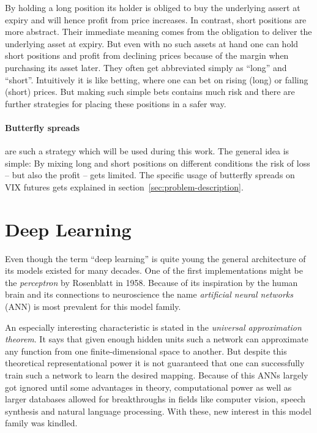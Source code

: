 By holding a long position its holder is obliged to buy the underlying assert at expiry and will hence profit from price increases. In contrast, short positions are more abstract. Their immediate meaning comes from the obligation to deliver the underlying asset at expiry. But even with no such assets at hand one can hold short positions and profit from declining prices because of the margin when purchasing its asset later. They often get abbreviated simply as ``long'' and ``short''. Intuitively it is like betting, where one can bet on rising (long) or falling (short) prices. But making such simple bets contains much risk and there are further strategies for placing these positions in a safer way.

\paragraph{Butterfly spreads} are such a strategy which will be used during this work. The general idea is simple: By mixing long and short positions on different conditions the risk of loss -- but also the profit -- gets limited. The specific usage of butterfly spreads on VIX futures gets explained in section~\ref{sec:problem-description}.

\section{Deep Learning}
\label{sec:deep-learning}

Even though the term ``deep learning'' is quite young the general architecture of its models existed for many decades. One of the first implementations might be the \emph{perceptron} by Rosenblatt in 1958. Because of its inspiration by the human brain and its connections to neuroscience the name \emph{artificial neural networks} (ANN) is most prevalent for this model family.

An especially interesting characteristic is stated in the \emph{universal approximation theorem}.\cite{Hornik-1989} It says that given enough hidden units such a network can approximate any function from one finite-dimensional space to another. But despite this theoretical representational power it is not guaranteed that one can successfully train such a network to learn the desired mapping. Because of this ANNs largely got ignored until some advantages in theory, computational power as well as larger databases allowed for breakthroughs in fields like computer vision, speech synthesis and natural language processing. With these, new interest in this model family was kindled.\cite[p.\,12ff.]{Goodfellow-et-al-2016}

